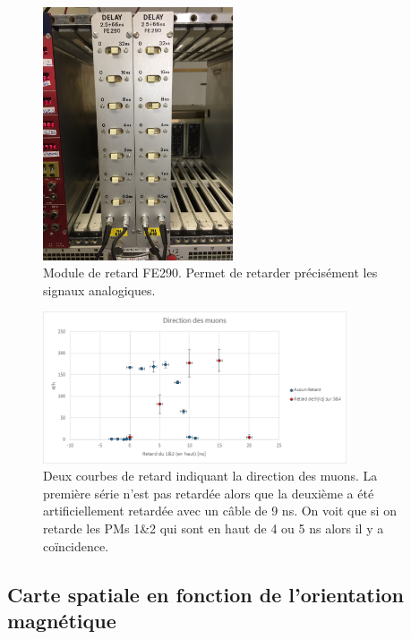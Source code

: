 \documentclass[12pt]{article}
\begin{document}
\begin{figure}[htpb!]
    \centering
    \includegraphics[width=0.5\textwidth]{Images/Photos/Delay2.jpg}
    \captionsetup{width=0.8\textwidth}
    \caption{Module de retard FE290. Permet de retarder précisément les signaux analogiques.}
    \label{fig:Delay}
\end{figure}

\begin{figure}[htpb!]
    \centering
    \includegraphics[width=0.8\textwidth]{graphiques/experience2/DirectionMuons.png}
    \captionsetup{width=0.8\textwidth}
    \caption{Deux courbes de retard indiquant la direction des muons. La première série n'est pas retardée alors que la deuxième a été artificiellement retardée avec un câble de 9 ns. On voit que si on retarde les PMs 1\&2 qui sont en haut de 4 ou 5 ns alors il y a coïncidence.}
    \label{fig:CourbeRetard}
\end{figure}



\subsection{Carte spatiale en fonction de l'orientation magnétique}
\end{document}
